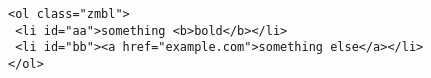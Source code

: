 \documentclass{article}
\begin{document}
\begin{verbatim}
<ol class="zmbl">
 <li id="aa">something <b>bold</b></li>
 <li id="bb"><a href="example.com">something else</a></li>
</ol>
\end{verbatim}
\end{document}
